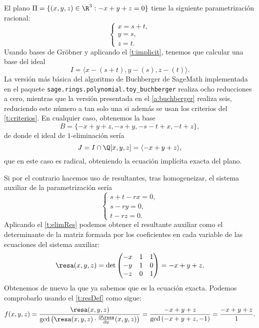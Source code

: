 \begin{ejemplo}
    El plano $\Pi = \{(x,y,z) \in \R^3 : -x+y+z=0\}$ tiene la siguiente parametrización racional:
    \begin{equation*}
        \begin{cases}
        x = s+t,\\
        y = s,\\
        z = t.
    \end{cases}
    \end{equation*}
    Usando bases de Gröbner y aplicando el \autoref{t:implicit}, tenemos que calcular una base del ideal
    \begin{equation*}
        I = \langle x-(s+t), y - (s), z-(t) \rangle.
    \end{equation*}
    La versión más básica del algoritmo de Buchberger de SageMath implementada en el paquete \texttt{sage.rings.polynomial.toy\_buchberger} realiza ocho reducciones a cero, mientras que la versión presentada en el \autoref{a:buchberger} realiza seis, reduciendo este número a tan solo una si además se usan los criterios del \autoref{t:criterios}. En cualquier caso, obtenemos la base
    \begin{equation*}
        B= \{-x + y + z, -s + y, -s - t + x, -t + z\},
    \end{equation*}
    de donde el ideal de $1$-eliminación sería
    \begin{equation*}
        J = I \cap \Q[x,y,z] = \langle -x + y + z  \rangle,
    \end{equation*}
    que en este caso es radical, obteniendo la ecuación implícita exacta del plano.\newline
    
    Si por el contrario hacemos uso de resultantes, tras homogeneizar, el sistema auxiliar de la parametrización sería
    \begin{equation*}
        \begin{cases}
            s+t-rx=0,\\
            s-ry=0,\\
            t-rz=0.
        \end{cases}
    \end{equation*}
    Aplicando el \autoref{t:elimRes} podemos obtener el resultante auxiliar como el determinante de la matriz formada por los coeficientes en cada variable de las ecuaciones del sistema auxiliar:
    \begin{equation*}
        \resa(x,y,z) = \det\begin{pmatrix} -x & 1 & 1\\ -y&1&0\\ -z&0&1 \end{pmatrix} = -x+y+z.
    \end{equation*}
    Obtenemos de nuevo la que ya sabemos que es la ecuación exacta. Podemos comprobarlo usando el \autoref{t:resDef} como sigue:
    \begin{equation*}
        f(x,y,z) = \frac{\resa(x,y,z)}{\gcd\left( \resa(x,y,z)\cdot \frac{\partial \resa}{\partial x}(x,y,z)  \right)} = \frac{-x+y+z}{\gcd\left( -x+y+z, -1  \right)} = \frac{-x+y+z}{1}.
    \end{equation*}
\end{ejemplo}
